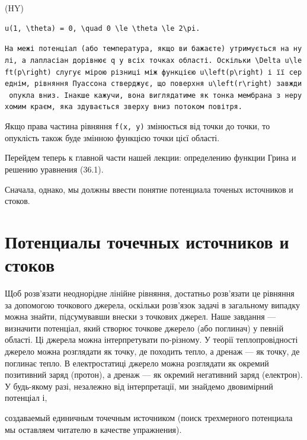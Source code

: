 \documentclass[
  ukrainian,
]{article}
\begin{document}
(HY)

\begin{verbatim}
u(1, \theta) = 0, \quad 0 \le \theta \le 2\pi.
\end{verbatim}

\texttt{На\ межі\ потенціал\ (або\ температура,\ якщо\ ви\ бажаєте)\ утримується\ на\ нулі,\ а\ лапласіан\ дорівнює\ q\ у\ всіх\ точках\ області.\ Оскільки\ \textquotesingle{}\textbackslash{}Delta\ u\textbackslash{}left(p\textbackslash{}right)\textquotesingle{}\ слугує\ мірою\ різниці\ між\ функцією\ \textquotesingle{}u\textbackslash{}left(p\textbackslash{}right)\textquotesingle{}\ і\ її\ середнім,\ рівняння\ Пуассона\ стверджує,\ що\ поверхня\ \textquotesingle{}u\textbackslash{}left(r\textbackslash{}right)\textquotesingle{}\ завжди\ опукла\ вниз.\ Інакше\ кажучи,\ вона\ виглядатиме\ як\ тонка\ мембрана\ з\ нерухомим\ краєм,\ яка\ здувається\ зверху\ вниз\ потоком\ повітря.}

Якщо права частина рівняння \texttt{f(x,\ y)} змінюється від точки до
точки, то опуклість також буде змінною функцією точки цієї області.

Перейдем теперь к главной части нашей лекции: определению функции Грина
и решению уравнения (36.1).

Сначала, однако, мы должны ввести понятие потенциала точеных источников
и стоков.

\section{Потенциалы точечных источников и
стоков}\label{ux43fux43eux442ux435ux43dux446ux438ux430ux43bux44b-ux442ux43eux447ux435ux447ux43dux44bux445-ux438ux441ux442ux43eux447ux43dux438ux43aux43eux432-ux438-ux441ux442ux43eux43aux43eux432}

Щоб розв'язати неоднорідне лінійне рівняння, достатньо розв'язати це
рівняння за допомогою точкового джерела, оскільки розв'язок задачі в
загальному випадку можна знайти, підсумувавши внески з точкових джерел.
Наше завдання --- визначити потенціал, який створює точкове джерело (або
поглинач) у певній області. Ці джерела можна інтерпретувати по-різному.
У теорії теплопровідності джерело можна розглядати як точку, де походить
тепло, а дренаж --- як точку, де поглинає тепло. В електростатиці
джерело можна розглядати як окремий позитивний заряд (протон), а дренаж
--- як окремий негативний заряд (електрон). У будь-якому разі, незалежно
від інтерпретації, ми знайдемо двовимірний потенціал і,

создаваемый единичным точечным источником (поиск трехмерного потенциала
мы оставляем читателю в качестве упражнения).
\end{document}
